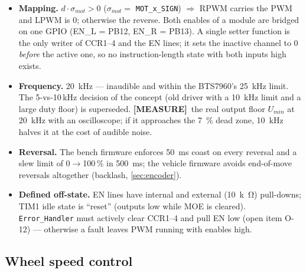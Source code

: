 \documentclass[11pt,a4paper]{article}
\newcommand{\mk}[2]{\textsf{\scriptsize\bfseries\colorbox{#1bg}{\color{#1}[#2]}}}
\newcommand{\MEASURE}{\mk{warn}{MEASURE}}
\newcommand{\code}[1]{\texttt{\small #1}}
\begin{document}
\begin{itemize}[leftmargin=6mm]
\item \textbf{Mapping.} $d\cdot\sigma_{mot}>0$ ($\sigma_{mot}=$ \code{MOT\_x\_SIGN}) $\Rightarrow$ RPWM carries
the PWM and LPWM is 0; otherwise the reverse. Both enables of a module are bridged
on one GPIO (EN\_L = PB12, EN\_R = PB13). A single setter function is the only
writer of CCR1--4 and the EN lines; it sets the inactive channel to 0
\emph{before} the active one, so no instruction-length state with both inputs
high exists.
\item \textbf{Frequency.} \qty{20}{kHz} --- inaudible and within the BTS7960's
\qty{25}{kHz} limit. The 5-vs-10\,kHz decision of the concept (old driver with a
\qty{10}{kHz} limit and a large duty floor) is superseded. \MEASURE\ the real
output floor $U_{min}$ at \qty{20}{kHz} with an oscilloscope; if it approaches the
\qty{7}{\percent} dead zone, \qty{10}{kHz} halves it at the cost of audible noise.
\item \textbf{Reversal.} The bench firmware enforces \qty{50}{ms} coast on every
reversal and a slew limit of 0$\to$100\,\% in \qty{500}{ms}; the vehicle firmware
avoids end-of-move reversals altogether (backlash, \cref{sec:encoder}).
\item \textbf{Defined off-state.} EN lines have internal and external
(\qty{10}{k\ohm}) pull-downs; TIM1 idle state is ``reset'' (outputs low while MOE
is cleared). \code{Error\_Handler} must actively clear CCR1--4 and pull EN low
(open item O-12) --- otherwise a fault leaves PWM running with enables high.
\end{itemize}

\subsection{Wheel speed control}\label{sec:speedloop}
\end{document}
